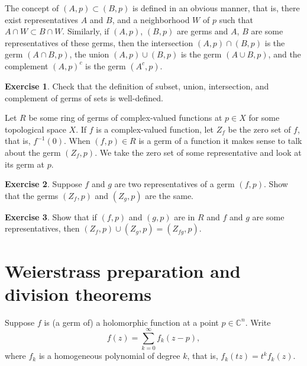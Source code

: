 \documentclass[12pt,openany]{book}
\newcommand{\C}{{\mathbb{C}}}
\theoremstyle{plain}
\theoremstyle{remark}
\theoremstyle{definition}
\newenvironment{exbox}{%
    \def\FrameCommand{\vrule width 1pt \relax\hspace{10pt}}%
    \MakeFramed{\advance\hsize-\width\FrameRestore}%
}{%
    \endMakeFramed
}
\theoremstyle{exercise}
\newtheorem{exercise}{Exercise}[section]
\theoremstyle{example}
\begin{document}
The concept of $(A,p) \subset (B,p)$ is defined in an obvious manner,
that is, there exist representatives $A$ and $B$, and a neighborhood $W$
of $p$ such that $A \cap W \subset B \cap W$.
Similarly,
if $(A,p)$, $(B,p)$ are germs and $A$, $B$
are some representatives of these germs, then
the intersection $(A,p) \cap (B,p)$
is the germ $(A \cap B,p)$, the union
$(A,p) \cup (B,p)$ is the germ $(A \cup B,p)$,
and the complement $(A,p)^c$ is the germ $(A^c,p)$.

\begin{exbox}
\begin{exercise}
Check that the definition of
subset, union, intersection, and complement of germs
of sets
is well-defined.
\end{exercise}
\end{exbox}


Let $R$ be some ring of germs of complex-valued
functions at $p \in X$ for some topological space $X$.
%
If $f$ is a complex-valued function,
let $Z_f$ be the zero set of $f$, that is, $f^{-1}(0)$.
When $(f,p) \in R$ is a germ of a function
it makes sense to talk about the germ $(Z_f,p)$.  We take the zero
set of some representative and look at its germ at $p$.

\begin{exbox}
\begin{exercise}
Suppose $f$ and $g$ are two representatives of a germ $(f,p)$.
Show that the germs $(Z_f,p)$ and $(Z_g,p)$ are the same.
\end{exercise}

\begin{exercise}
Show that if $(f,p)$ and $(g,p)$ are in $R$
and $f$ and $g$ are some representatives, then
$(Z_f,p) \cup (Z_g,p) = (Z_{fg},p)$.
\end{exercise}
\end{exbox}


\section{Weierstrass preparation and division theorems} \label{sec:wpt}

Suppose
$f$ is (a germ of) a holomorphic function at a point $p \in \C^n$.
Write
\begin{equation*}
f(z) = \sum_{k=0}^\infty f_k(z-p),
\end{equation*}
where $f_k$ is a homogeneous polynomial of degree $k$,
that is, $f_k(tz) = t^k f_k(z)$.
\end{document}
